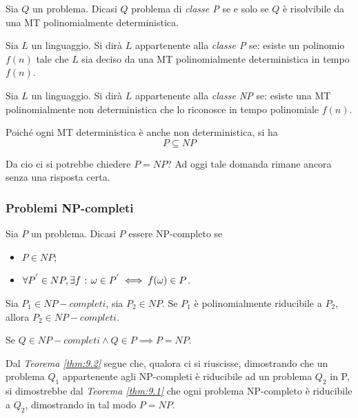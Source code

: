 \documentclass{subfiles}
\begin{document}
\begin{Definition*}
    Sia \(Q\) un problema. Dicasi \(Q\) problema di \emph{classe P} se e solo se \(Q\) è risolvibile da una MT polinomialmente deterministica.
\end{Definition*}

\begin{Definition*}
    Sia \(L\) un linguaggio. Si dirà \(L\) appartenente alla \emph{classe P} se:
    esiste un polinomio \(f(n)\) tale che \(L\) sia deciso da una MT polinomialmente deterministica in tempo \(f(n)\).
\end{Definition*}

\begin{Definition*}
    Sia \(L\) un linguaggio. Si dirà \(L\) appartenente alla \emph{classe NP} se:
    esiste una MT polinomialmente non deterministica che lo riconosce in tempo polinomiale \(f(n)\).
\end{Definition*}

\begin{Remark*}
    Poiché ogni MT deterministica è anche non deterministica, si ha
    \[
        P \subseteq NP
    \]

    \noindent Da cio ci si potrebbe chiedere \(P = NP\)? Ad oggi tale domanda rimane ancora senza una risposta certa.
\end{Remark*}
\clearpage

\subsubsection{Problemi NP-completi}
\begin{Definition*}
    Sia \(P\) un problema. Dicasi \(P\) essere NP-completo se
    \begin{itemize}
        \item \(P \in NP\);
        \item \(\forall P^{'} \in NP, \exists f \operatorname{\: {:} \:} \omega \in P^{'} \iff f(\omega) \in P\).
    \end{itemize}
\end{Definition*}

\begin{Theorem}\label{thm:9.1}
    Sia \(P_{1} \in NP-completi\), sia \(P_{2} \in NP\). Se \(P_{1}\) è polinomialmente riducibile a \(P_{2}\), allora \(P_{2} \in NP-completi\).
\end{Theorem}

\begin{Theorem}\label{thm:9.2}
    Se \(Q \in NP-completi \land Q \in P \implies P = NP\).
\end{Theorem}

\begin{Note*}
    Dal \emph{Teorema \eqref{thm:9.2}} segue che, qualora ci si riuscisse, dimostrando che un problema \(Q_{1}\) appartenente agli NP-completi è riducibile ad un problema \(Q_{2}\) in P,
    si dimostrebbe dal \emph{Teorema \eqref{thm:9.1}} che ogni problema NP-completo è riducibile a \(Q_{2}\), dimostrando in tal modo \(P = NP\).
\end{Note*}
\end{document}
